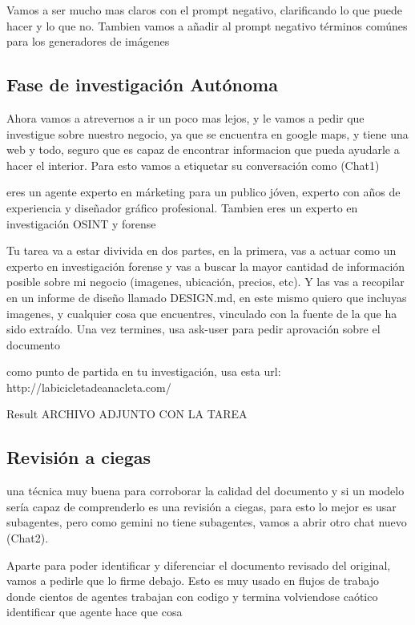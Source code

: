 \documentclass[12pt,a4paper]{article}
\begin{document}
Vamos a ser mucho mas claros con el prompt negativo, clarificando lo que puede hacer y lo que no. Tambien vamos a añadir al prompt negativo términos comúnes para los generadores de imágenes


\subsection{Fase de investigación Autónoma}

Ahora vamos a atrevernos a ir un poco mas lejos, y le vamos a pedir que investigue sobre nuestro negocio, ya que se encuentra en google maps, y tiene una web y todo, seguro que es capaz de encontrar informacion que pueda ayudarle a hacer el interior. Para esto vamos a etiquetar su conversación como (Chat1)

\begin{AgenticPromptbox}
eres un agente experto en márketing para un publico jóven, experto con años de experiencia y diseñador gráfico profesional. Tambien eres un experto en investigación OSINT y forense

Tu tarea va a estar divivida en dos partes, en la primera, vas a actuar como un experto en investigación forense y vas a buscar la mayor cantidad de información posible sobre mi negocio (imagenes, ubicación, precios, etc). Y las vas a recopilar en un informe de diseño llamado DESIGN.md, en este mismo quiero que incluyas imagenes, y cualquier cosa que encuentres, vinculado con la fuente de la que ha sido extraído. Una vez termines, usa ask-user para pedir aprovación sobre el documento

como punto de partida en tu investigación, usa esta url: http://labicicletadeanacleta.com/

\end{AgenticPromptbox}

\begin{result}{Result}
    ARCHIVO ADJUNTO CON LA TAREA
\end{result}


\subsection{Revisión a ciegas}

una técnica muy buena para corroborar la calidad del documento y si un modelo sería capaz de comprenderlo es una revisión a ciegas, para esto lo mejor es usar subagentes, pero como gemini no tiene subagentes, vamos a abrir otro chat nuevo (Chat2).

Aparte para poder identificar y diferenciar el documento revisado del original, vamos a pedirle que lo firme debajo. Esto es muy usado en flujos de trabajo donde cientos de agentes trabajan con codigo y termina volviendose caótico identificar que agente hace que cosa
\end{document}
